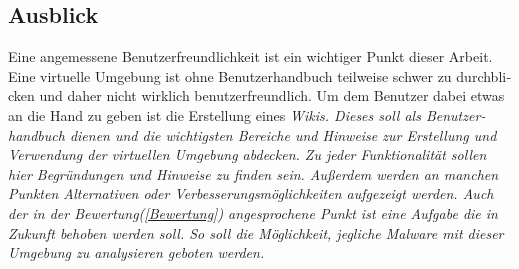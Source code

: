 \begin{otherlanguage}{ngerman}
\subsection{Ausblick}
Eine angemessene Benutzerfreundlichkeit ist ein wichtiger Punkt dieser Arbeit. Eine virtuelle Umgebung ist ohne Benutzerhandbuch teilweise schwer zu durchblicken und daher nicht wirklich benutzerfreundlich. Um dem Benutzer dabei etwas an die Hand zu geben ist die Erstellung eines \it Wikis\rm. Dieses soll als Benutzerhandbuch dienen und die wichtigsten Bereiche und Hinweise zur Erstellung und Verwendung der virtuellen Umgebung abdecken. Zu jeder Funktionalität sollen hier Begründungen und Hinweise zu finden sein. Außerdem werden an manchen Punkten Alternativen oder Verbesserungsmöglichkeiten aufgezeigt werden. \newline
Auch der in der Bewertung(\ref{Bewertung}) angesprochene Punkt ist eine Aufgabe die in Zukunft behoben werden soll. So soll die Möglichkeit, jegliche Malware mit dieser Umgebung zu analysieren geboten werden.
\end{otherlanguage}